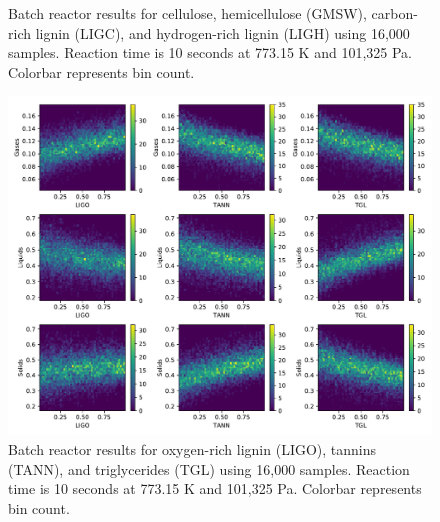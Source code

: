 \begin{figure}[H]
    \centering
    \caption{Batch reactor results for cellulose, hemicellulose (GMSW), carbon-rich lignin (LIGC), and hydrogen-rich lignin (LIGH) using 16,000 samples. Reaction time is 10 seconds at 773.15 K and 101,325 Pa. Colorbar represents bin count.}
    \label{fig:batch-sa1}
\end{figure}

\begin{figure}[H]
    \centering
    \includegraphics[width=\textwidth]{figures/sa-hexbin2-n1000.pdf}
    \caption{Batch reactor results for oxygen-rich lignin (LIGO), tannins (TANN), and triglycerides (TGL) using 16,000 samples. Reaction time is 10 seconds at 773.15 K and 101,325 Pa. Colorbar represents bin count.}
    \label{fig:batch-sa2}
\end{figure}

